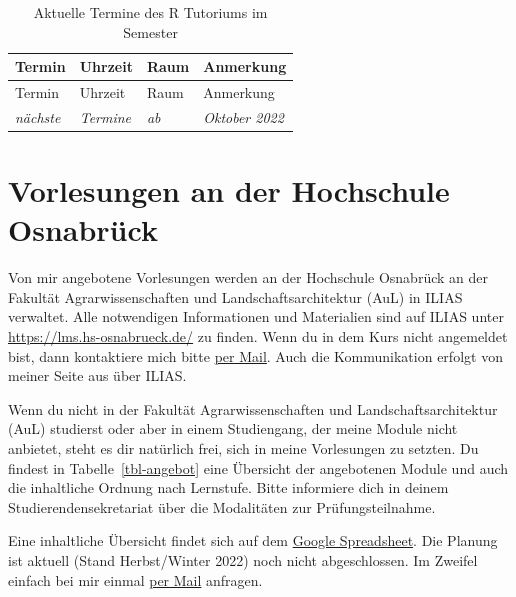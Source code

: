 \documentclass[
  letterpaper,
]{scrbook}
\begin{document}
\hypertarget{tbl-r-tutorium}{}
\begin{longtable}[]{@{}llll@{}}
\caption{\label{tbl-r-tutorium}Aktuelle Termine des R Tutoriums im
Semester}\tabularnewline
\toprule()
Termin & Uhrzeit & Raum & Anmerkung \\
\midrule()
\endfirsthead
\toprule()
Termin & Uhrzeit & Raum & Anmerkung \\
\midrule()
\endhead
\emph{nächste} & \emph{Termine} & \emph{ab} & \emph{Oktober 2022} \\
\bottomrule()
\end{longtable}

\hypertarget{sec-vorlesungen-hs}{%
\section{Vorlesungen an der Hochschule
Osnabrück}\label{sec-vorlesungen-hs}}

Von mir angebotene Vorlesungen werden an der Hochschule Osnabrück an der
Fakultät Agrarwissenschaften und Landschaftsarchitektur (AuL) in ILIAS
verwaltet. Alle notwendigen Informationen und Materialien sind auf ILIAS
unter \url{https://lms.hs-osnabrueck.de/} zu finden. Wenn du in dem Kurs
nicht angemeldet bist, dann kontaktiere mich bitte
\protect\hyperlink{sec-contact-mail}{per Mail}. Auch die Kommunikation
erfolgt von meiner Seite aus über ILIAS.

{}

Wenn du nicht in der Fakultät Agrarwissenschaften und
Landschaftsarchitektur (AuL) studierst oder aber in einem Studiengang,
der meine Module nicht anbietet, steht es dir natürlich frei, sich in
meine Vorlesungen zu setzten. Du findest in Tabelle~\ref{tbl-angebot}
eine Übersicht der angebotenen Module und auch die inhaltliche Ordnung
nach Lernstufe. Bitte informiere dich in deinem Studierendensekretariat
über die Modalitäten zur Prüfungsteilnahme.

Eine inhaltliche Übersicht findet sich auf dem
\href{https://docs.google.com/spreadsheets/d/1WCTnJnofz5OrGZth6LKyPGQvQUUw31t7OfnAE6yz-ww/edit?usp=sharing}{Google
Spreadsheet}. Die Planung ist aktuell (Stand Herbst/Winter 2022) noch
nicht abgeschlossen. Im Zweifel einfach bei mir einmal
\protect\hyperlink{sec-contact-mail}{per Mail} anfragen.
\end{document}
